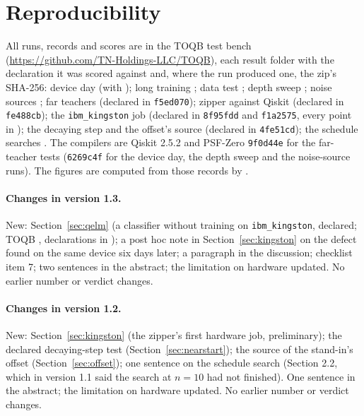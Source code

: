 \documentclass[11pt]{article}
\begin{document}
\section{Reproducibility}

All runs, records and scores are in the TOQB test bench (\url{https://github.com/TN-Holdings-LLC/TOQB}), each result folder with the declaration it was scored against and, where the run produced one, the zip's SHA-256: device day
 (with ); long training ;
data test ; depth sweep ; noise sources
; far teachers  (declared in
\texttt{f5ed070}); zipper against Qiskit  (declared in \texttt{fe488cb}); the
\texttt{ibm\_kingston} job  (declared in \texttt{8f95fdd} and \texttt{f1a2575}, every
point in ); the decaying step and the offset's source  (declared in
\texttt{4fe51cd}); the schedule searches . The
compilers are Qiskit 2.5.2 and PSF-Zero \texttt{9f0d44e} for the far-teacher tests (\texttt{6269c4f} for the device
day, the depth sweep and the noise-source runs). The figures are computed from those records by
.

\paragraph{Changes in version 1.3.} New: Section~\ref{sec:qelm} (a classifier without training on
\texttt{ibm\_kingston}, declared; TOQB , declarations in
); a post hoc note in Section~\ref{sec:kingston} on the defect found on the same
device six days later; a paragraph in the discussion; checklist item 7; two sentences in the abstract; the limitation
on hardware updated. No earlier number or verdict changes.

\paragraph{Changes in version 1.2.} New: Section~\ref{sec:kingston} (the zipper's first hardware job, preliminary);
the declared decaying-step test (Section~\ref{sec:nearstart}); the source of the stand-in's offset
(Section~\ref{sec:offset}); one sentence on the schedule search (Section 2.2, which in version 1.1 said the search at
$n = 10$ had not finished). One sentence in the abstract; the limitation on hardware updated. No earlier number or
verdict changes.
\end{document}
